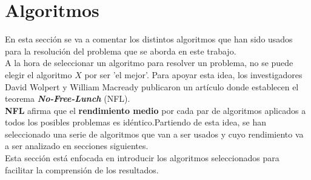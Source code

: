 \chapter{Algoritmos}
\label{sec:algoritmos}
En esta sección se va a comentar los distintos algoritmos que han sido usados para la resolución del problema que se aborda en este trabajo.\\
A la hora de seleccionar un algoritmo para resolver un problema, no se puede elegir el algoritmo $X$ por ser 'el mejor'. Para apoyar esta idea, los investigadores David Wolpert y William Macready publicaron un artículo donde establecen el teorema \textbf{\textit{No-Free-Lunch}} (NFL).\\
\textbf{NFL} afirma que el \textbf{rendimiento medio} por cada par de algoritmos aplicados a todos los posibles problemas es idéntico.Partiendo de esta idea, se han seleccionado una serie de algoritmos que van a ser usados y cuyo rendimiento va a ser analizado en secciones siguientes. \\
\linebreak
Esta sección está enfocada en introducir los algoritmos seleccionados para facilitar la comprensión de los resultados.
